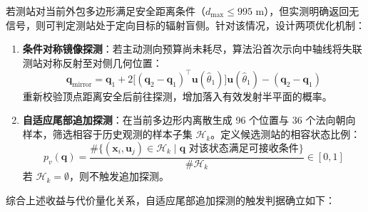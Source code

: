 \documentclass[zihao=-4,a4paper,UTF8]{ctexart}
\begin{document}
若测站对当前外包多边形满足安全距离条件（$d_{\max} \le 995\text{ m}$），但实测明确返回无信号，则可判定测站处于定向目标的辐射盲侧。针对该情况，设计两项优化机制：
\begin{enumerate}[leftmargin=2.2em, itemsep=0.04em, topsep=0.03em]
    \item \textbf{条件对称镜像探测}：若主动测向预算尚未耗尽，算法沿首次示向中轴线将失联测站对称反射至对侧几何位置：
    \begin{equation}
        \mathbf{q}_{\mathrm{mirror}} = \mathbf{q}_1 + 2 \big[ (\mathbf{q}_2 - \mathbf{q}_1)^\top \mathbf{u}(\hat{\theta}_1) \big] \mathbf{u}(\hat{\theta}_1) - (\mathbf{q}_2 - \mathbf{q}_1)
    \end{equation}
    重新校验顶点距离安全后前往探测，增加落入有效发射半平面的概率。
    \item \textbf{自适应尾部追加探测}：在当前多边形内离散生成 96 个位置与 36 个法向朝向样本，筛选相容于历史观测的样本子集 $\mathcal{H}_k$。定义候选测站的相容状态比例：
    \begin{equation}
        p_v(\mathbf{q}) = \frac{\#\{(\mathbf{x}_i, \mathbf{u}_j) \in \mathcal{H}_k \mid \mathbf{q} \text{ 对该状态满足可接收条件}\}}{\#\mathcal{H}_k} \in [0, 1]
    \end{equation}
    若 $\mathcal{H}_k = \emptyset$，则不触发追加探测。
\end{enumerate}

综合上述收益与代价量化关系，自适应尾部追加探测的触发判据确立如下：
\end{document}
